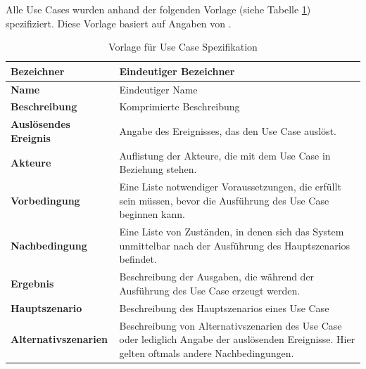 Alle Use Cases wurden anhand der folgenden Vorlage (siehe Tabelle \ref{table:use_case_template}) spezifiziert. Diese Vorlage basiert auf Angaben von \cite{req_eng_book}.

\begin{table}[ht]
\centering
  \begin{tabular}{ l | p{10cm} }
	\hline
	\rowcolor{gray}
	\textbf{Bezeichner}&	\textbf{Eindeutiger Bezeichner}\\ \hline
	\textbf{Name}		&	Eindeutiger Name\\ \hline
	\textbf{Beschreibung}	&	Komprimierte Beschreibung\\ \hline
	\textbf{Auslösendes Ereignis} &	Angabe des Ereignisses, das den Use Case auslöst.\\ \hline
	\textbf{Akteure}		&	Auflistung der Akteure, die mit dem Use Case in Beziehung stehen.\\ \hline
	\textbf{Vorbedingung}	&	Eine Liste notwendiger Voraussetzungen, die erfüllt sein müssen, bevor die Ausführung des Use Case beginnen kann.\\ \hline
	\textbf{Nachbedingung}	&	Eine Liste von Zuständen, in denen sich das System unmittelbar nach der Ausführung des Hauptszenarios befindet.\\ \hline
	\textbf{Ergebnis}		&	Beschreibung der Ausgaben, die während der Ausführung des Use Case erzeugt werden.\\ \hline
	\textbf{Hauptszenario}	&	Beschreibung des Hauptszenarios eines Use Case\\ \hline
	\textbf{Alternativszenarien}	&	Beschreibung von Alternativszenarien des Use Case oder lediglich Angabe der auslösenden Ereignisse. 
					Hier gelten oftmals andere Nachbedingungen.\\ \hline
  \end{tabular}
   \caption{Vorlage für Use Case Spezifikation}\label{table:use_case_template}
\end{table}

